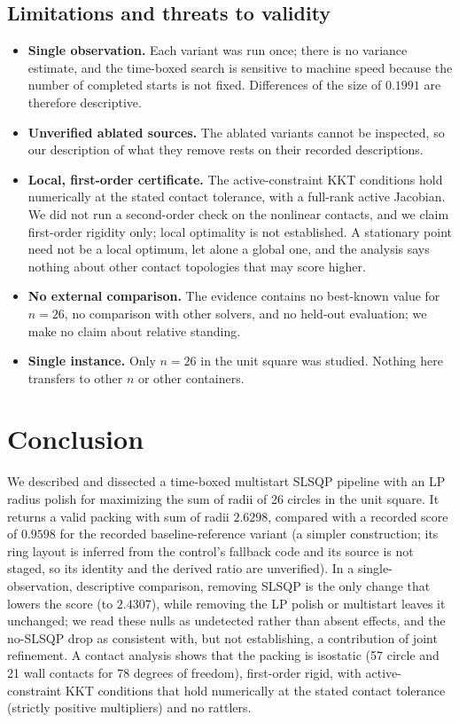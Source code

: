 \documentclass{article} %
\begin{document}
\subsection{Limitations and threats to validity}\label{sec:limits}
\begin{itemize}
\item \textbf{Single observation.} Each variant was run once; there is no variance estimate, and the time-boxed search is sensitive to machine speed because the number of completed starts is not fixed. Differences of the size of $0.1991$ are therefore descriptive.
\item \textbf{Unverified ablated sources.} The ablated variants cannot be inspected, so our description of what they remove rests on their recorded descriptions.
\item \textbf{Local, first-order certificate.} The active-constraint KKT conditions hold numerically at the stated contact tolerance, with a full-rank active Jacobian. We did not run a second-order check on the nonlinear contacts, and we claim first-order rigidity only; local optimality is not established. A stationary point need not be a local optimum, let alone a global one, and the analysis says nothing about other contact topologies that may score higher.
\item \textbf{No external comparison.} The evidence contains no best-known value for $n=26$, no comparison with other solvers, and no held-out evaluation; we make no claim about relative standing.
\item \textbf{Single instance.} Only $n=26$ in the unit square was studied. Nothing here transfers to other $n$ or other containers.
\end{itemize}

\section{Conclusion}
We described and dissected a time-boxed multistart SLSQP pipeline with an LP radius polish for maximizing the sum of radii of 26 circles in the unit square. It returns a valid packing with sum of radii $2.6298$, compared with a recorded score of $0.9598$ for the recorded baseline-reference variant (a simpler construction; its ring layout is inferred from the control's fallback code and its source is not staged, so its identity and the derived ratio are unverified). In a single-observation, descriptive comparison, removing SLSQP is the only change that lowers the score (to $2.4307$), while removing the LP polish or multistart leaves it unchanged; we read these nulls as undetected rather than absent effects, and the no-SLSQP drop as consistent with, but not establishing, a contribution of joint refinement. A contact analysis shows that the packing is isostatic (57 circle and 21 wall contacts for 78 degrees of freedom), first-order rigid, with active-constraint KKT conditions that hold numerically at the stated contact tolerance (strictly positive multipliers) and no rattlers.
\end{document}
